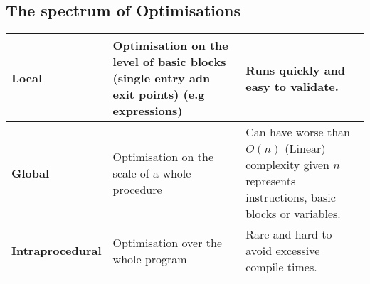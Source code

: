 \documentclass{report}
\begin{document}
\subsection*{The spectrum of Optimisations}
\begin{center}
	\begin{tabular}{l | p{}  | p{}}
		\textbf{Local}           & Optimisation on the level of basic blocks (single entry adn exit points) (e.g expressions) & Runs quickly and easy to validate.                                                                           \\
		\hline
		\textbf{Global}          & Optimisation on the scale of a whole procedure                                             & Can have worse than $O(n)$ (Linear) complexity given $n$ represents instructions, basic blocks or variables. \\
		\hline
		\textbf{Intraprocedural} & Optimisation over the whole program                                                        & Rare and hard to avoid excessive compile times.                                                              \\
	\end{tabular}
\end{center}
\end{document}
